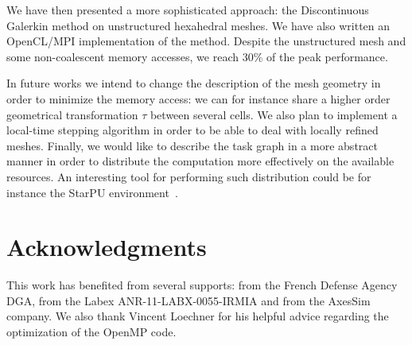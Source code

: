 \documentclass[preprint]{sig-alternate}
\begin{document}
We have then presented a more sophisticated approach: the Discontinuous Galerkin method on unstructured hexahedral meshes. We have also written an OpenCL/MPI implementation of the method. Despite the unstructured mesh and some non-coalescent memory accesses, we reach 30\% of the peak performance.

In future works we intend to change the description of the mesh geometry in order to minimize the memory access: we can for instance share a higher order geometrical transformation $\tau$ between several cells. We also plan to implement a local-time stepping algorithm in order to be able to deal with locally refined meshes.  Finally, we would like to describe the task graph in a more abstract manner in order to distribute the computation more effectively  on the available resources. An interesting tool for performing such distribution could be for instance the StarPU environment~\cite{augonnet2011starpu}.


\section{Acknowledgments}
This work has benefited from several supports: from the French Defense
Agency DGA, from the Labex ANR-11-LABX-0055-IRMIA and from the AxesSim
company.  We also thank Vincent Loechner for his helpful advice
regarding the optimization of the OpenMP code.

%

%
%
\end{document}
